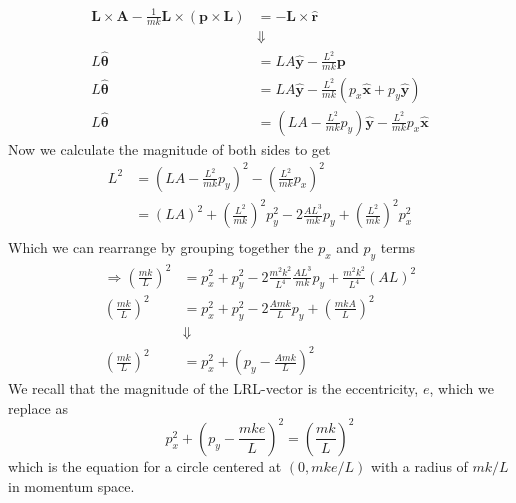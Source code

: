 \documentclass[11pt]{article}
\numberwithin{equation}{section}
\begin{document}
\begin{enumerate}[(a)]
\begin{align*}
\mathbf{L}\times\mathbf{A} - \frac{1}{mk}\mathbf{L}\times\left(\mathbf{p}\times\mathbf{L}\right) &= - \mathbf{L}\times\mathbf{\hat{r}}\\
&\Downarrow\\
L\mathbf{\hat{\theta}} &= LA\mathbf{\hat{y}} - \frac{L^2}{mk}\mathbf{p}\\
L\mathbf{\hat{\theta}} &= LA\mathbf{\hat{y}} - \frac{L^2}{mk}(p_x\mathbf{\hat{x}}+p_y\mathbf{\hat{y}})\\
L\mathbf{\hat{\theta}} &= \left(LA - \frac{L^2}{mk}p_y\right)\mathbf{\hat{y}} - \frac{L^2}{mk}p_x\mathbf{\hat{x}}
\end{align*}
Now we calculate the magnitude of both sides to get
\begin{align*}
L^2 &= \left(LA - \frac{L^2}{mk}p_y\right)^2 - \left(\frac{L^2}{mk}p_x\right)^2\\
&= (LA)^2 + \left(\frac{L^2}{mk}\right)^2p_y^2 - 2\frac{AL^3}{mk}p_y + \left(\frac{L^2}{mk}\right)^2p_x^2\\
\end{align*}
Which we can rearrange by grouping together the $p_x$ and $p_y$ terms
\begin{align*}
\Rightarrow\left(\frac{mk}{L}\right)^2 &= p_x^2 + p_y^2 - 2\frac{m^2k^2}{L^4}\frac{AL^3}{mk}p_y + \frac{m^2k^2}{L^4}(AL)^2\\
\left(\frac{mk}{L}\right)^2 &= p_x^2 + p_y^2 - 2\frac{Amk}{L}p_y + \left(\frac{mkA}{L}\right)^2\\
&\Downarrow\\
\left(\frac{mk}{L}\right)^2 &= p_x^2 + \left(p_y - \frac{Amk}{L}\right)^2
\end{align*}
We recall that the magnitude of the LRL-vector is the eccentricity, $e$, which we replace as
\begin{equation}
p_x^2 + \left(p_y - \frac{mke}{L}\right)^2 = \left(\frac{mk}{L}\right)^2
\label{MomCirc}
\end{equation}
which is the equation for a circle centered at $(0,mke/L)$ with a radius of $mk/L$ in 
momentum space.


\end{enumerate}
\end{document}
